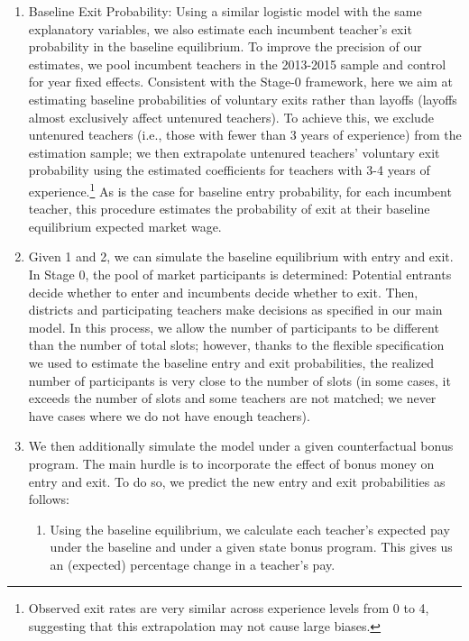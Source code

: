 \documentclass[notitlepage,12pt]{article}%
\begin{document}
\begin{enumerate}
\item Baseline Exit Probability: Using a similar logistic model with the same
explanatory variables, we also estimate each incumbent teacher's exit
probability in the baseline equilibrium. To improve the precision of our
estimates, we pool incumbent teachers in the 2013-2015 sample and control for
year fixed effects. Consistent with the Stage-0 framework, here we aim at
estimating baseline probabilities of voluntary exits rather than layoffs
(layoffs almost exclusively affect untenured teachers). To achieve this, we
exclude untenured teachers (i.e., those with fewer than 3 years of experience)
from the estimation sample; we then extrapolate untenured teachers' voluntary
exit probability using the estimated coefficients for teachers with 3-4 years
of experience.\footnote{Observed exit rates are very similar across experience
levels from 0 to 4, suggesting that this extrapolation may not cause large
biases.} As is the case for baseline entry probability, for each incumbent
teacher, this procedure estimates the probability of exit at their baseline
equilibrium expected market wage.

\item Given 1 and 2, we can simulate the baseline equilibrium with entry and
exit. In Stage 0, the pool of market participants is determined: Potential
entrants decide whether to enter and incumbents decide whether to exit. Then,
districts and participating teachers make decisions as specified in our main
model. In this process, we allow the number of participants to be different
than the number of total slots; however, thanks to the flexible specification
we used to estimate the baseline entry and exit probabilities, the realized
number of participants is very close to the number of slots (in some cases, it
exceeds the number of slots and some teachers are not matched; we never have
cases where we do not have enough teachers).

\item We then additionally simulate the model under a given counterfactual
bonus program. The main hurdle is to incorporate the effect of bonus money on
entry and exit. To do so, we predict the new entry and exit probabilities as follows:

\begin{enumerate}
\item Using the baseline equilibrium, we calculate each teacher's expected pay
under the baseline and under a given state bonus program. This gives us an
(expected) percentage change in a teacher's pay.


\end{enumerate}
\end{enumerate}
\end{document}
